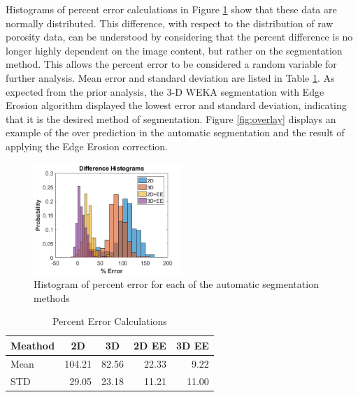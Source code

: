 \documentclass[11pt, twocolumn]{IEEEtran}
\begin{document}
Histograms of percent error calculations in Figure \ref{fig:DiffHist} show that these data are normally distributed. This difference, with respect to the distribution of raw porosity data, can be understood by considering that the percent difference is no longer highly dependent on the image content, but rather on the segmentation method. This allows the percent error to be considered a random variable for further analysis. Mean error and standard deviation are listed in Table \ref{tab:DiffTable}. As expected from the prior analysis, the 3-D WEKA segmentation with Edge Erosion algorithm displayed the lowest error and standard deviation, indicating that it is the desired method of segmentation. Figure \ref{fig:overlay} displays an example of the over prediction in the automatic segmentation and the result of applying the Edge Erosion correction. 

\begin{figure}[h!]
	\centering
	\includegraphics[width=0.5\textwidth]{DifferenceHistograms.png}
	\caption{Histogram of percent error for each of the automatic segmentation methods}
	\label{fig:DiffHist}
\end{figure}
\begin{table}[htbp]
	\centering
	\caption{Percent Error Calculations}
	\begin{tabular}{|l|r|r|r|r|}
		\toprule
		Meathod & \multicolumn{1}{c|}{2D} & \multicolumn{1}{c|}{3D} & \multicolumn{1}{c|}{2D EE} & \multicolumn{1}{c|}{3D EE} \\
		\midrule
		Mean  & 104.21 & 82.56 & 22.33 & 9.22 \\
		\midrule
		STD   & 29.05 & 23.18 & 11.21 & 11.00 \\
		\bottomrule
	\end{tabular}%
	\label{tab:DiffTable}%
\end{table}%
\end{document}

